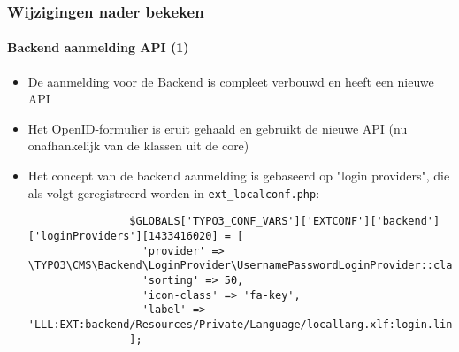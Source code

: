 \begin{frame}[fragile]
	\frametitle{Wijzigingen nader bekeken}
	\framesubtitle{Backend aanmelding API (1)}

	\lstset{basicstyle=\tiny\ttfamily}

	\begin{itemize}

		\item De aanmelding voor de Backend is compleet verbouwd en heeft een nieuwe API

		\item Het OpenID-formulier is eruit gehaald en gebruikt de nieuwe API
			(nu onafhankelijk van de klassen uit de core)

		\item Het concept van de backend aanmelding is gebaseerd op "login providers", die
			als volgt geregistreerd worden in \texttt{ext\_localconf.php}:

			\begin{lstlisting}
				$GLOBALS['TYPO3_CONF_VARS']['EXTCONF']['backend']['loginProviders'][1433416020] = [
				  'provider' => \TYPO3\CMS\Backend\LoginProvider\UsernamePasswordLoginProvider::class,
				  'sorting' => 50,
				  'icon-class' => 'fa-key',
				  'label' => 'LLL:EXT:backend/Resources/Private/Language/locallang.xlf:login.link'
				];
			\end{lstlisting}

	\end{itemize}

\end{frame}



